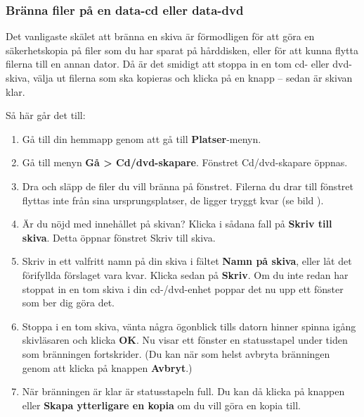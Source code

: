 \documentclass[a4paper,final]{memoir} %
\begin{document}
\subsubsection{Bränna filer på en data-cd eller data-dvd}\label{nautilus-burn-data}


Det vanligaste skälet att bränna en skiva är förmodligen för att göra en säkerhetskopia på filer som du har sparat på hårddisken, eller för att kunna flytta filerna till en annan dator. Då är det smidigt att stoppa in en tom cd- eller dvd-skiva, välja ut filerna som ska kopieras och klicka på en knapp -- sedan är skivan klar. 


Så här går det till:

\begin{enumerate}
\item Gå till din hemmapp genom att gå till \textbf{Platser}-menyn.
\item Gå till menyn \textbf{Gå \textgreater{} Cd/dvd-skapare}. Fönstret Cd/dvd-skapare öppnas.
\item Dra och släpp de filer du vill bränna på fönstret. Filerna du drar till fönstret flyttas inte från sina ursprungsplatser, de ligger tryggt kvar (se bild ).
\item Är du nöjd med innehållet på skivan? Klicka i sådana fall på \textbf{Skriv till skiva}. Detta öppnar fönstret Skriv till skiva.
\item Skriv in ett valfritt namn på din skiva i fältet \textbf{Namn på skiva}, eller låt det förifyllda förslaget vara kvar. Klicka sedan på \textbf{Skriv}. Om du inte redan har stoppat in en tom skiva i din cd-/dvd-enhet poppar det nu upp ett fönster som ber dig göra det.
\item Stoppa i en tom skiva, vänta några ögonblick tills datorn hinner spinna igång skivläsaren och klicka \textbf{OK}. Nu visar ett fönster en statusstapel under tiden som bränningen fortskrider. (Du kan när som helst avbryta bränningen genom att klicka på knappen \textbf{Avbryt}.)
\item När bränningen är klar är statusstapeln full. Du kan då klicka på knappen \xstang{} eller \textbf{Skapa ytterligare en kopia} om du vill göra en kopia till.
\end{enumerate}
\end{document}
